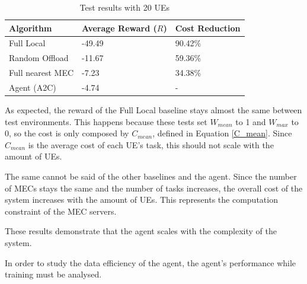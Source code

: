 \documentclass[conference]{IEEEtran}
\begin{document}
\begin{table}[H]
\centering
\begin{tabular}{|l|l|l|}
\hline
Algorithm        & Average Reward ($R$) & Cost Reduction\\ \hline
Full Local       & -49.49 & 90.42\%\\
Random Offload   & -11.67 & 59.36\%\\
Full nearest MEC & -7.23 & 34.38\%\\ 
Agent (A2C) & -4.74 & -\\ \hline
\end{tabular}
\caption{Test results with 20 \acrshort{UE}s} \label{results_5_20}
\end{table}

As expected, the reward of the Full Local baseline stays almost the same between test environments. This happens because these tests set $W_{mean}$ to 1 and $W_{max}$ to 0, so the cost is only composed by $C_{mean}$, defined in Equation \ref{C_mean}. Since $C_{mean}$ is the average cost of each \acrshort{UE}'s task, this should not scale with the amount of \acrshort{UE}s.

The same cannot be said of the other baselines and the agent. Since the number of \acrshort{MEC}s stays the same and the number of tasks increases, the overall cost of the system increases with the amount of \acrshort{UE}s. This represents the computation constraint of the \acrshort{MEC} servers. 

These results demonstrate that the agent scales with the complexity of the system.

In order to study the data efficiency of the agent, the agent's performance while training must be analysed.
\end{document}
